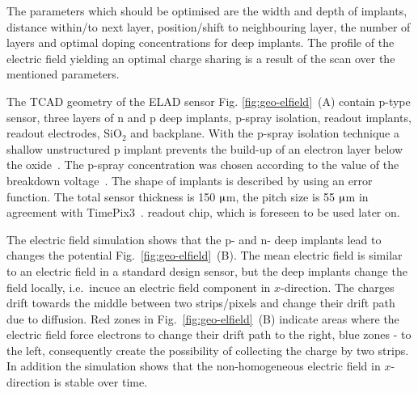 The parameters which should be optimised are the width and depth of implants, distance within/to next layer, position/shift to neighbouring layer,
 the number of layers and optimal doping concentrations for deep implants.
The profile of the electric field yielding an optimal charge sharing is a result of the scan over the mentioned parameters. 

The TCAD geometry of the ELAD sensor Fig. \ref{fig:geo-elfield}~(A) contain p-type sensor, three layers of n and p deep implants, p-spray isolation, readout implants, readout electrodes, SiO${}_2$ and backplane. 
With the p-spray isolation technique a shallow unstructured p implant prevents the build-up of an electron layer below the oxide~\cite{Lutz}. 
The p-spray concentration was chosen according to the value of the breakdown voltage~\cite{Pellegrini}. 
The shape of implants is described by using an error function. 
The total sensor thickness is 150 $\muup$m, the pitch size is 55 $\muup$m in agreement with TimePix3~\cite{TimePix}. readout chip, which is foreseen to be used later on. 

The electric field simulation shows that the p- and n- deep implants lead to changes the potential Fig.~\ref{fig:geo-elfield}~(B). %
The mean electric field is similar to an electric field in a standard design sensor, but the deep implants change the field locally, i.e.\ incuce an electric field component in $x$-direction. %
The charges drift towards the middle between two strips/pixels and change their drift path due to diffusion. %
Red zones in Fig.~\ref{fig:geo-elfield}~(B) indicate areas where the electric field force electrons to change their drift path to the right, blue zones - to the left, consequently create the possibility of collecting the charge by two strips. 
In addition the simulation shows that the non-homogeneous electric field in $x$-direction is stable over time. 


